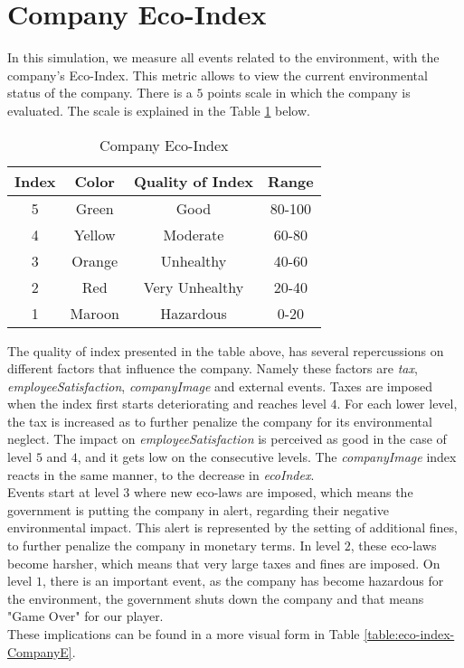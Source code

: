 \section{Company Eco-Index}
\label{sec:compEco-idex}
In this simulation, we measure all events related to the environment, with the company's Eco-Index. This metric allows to view the current environmental status of the company. There is a $5$ points scale in which the company is evaluated. The scale is explained in the Table \ref{table:eco-index-Company} below. \\

\begin{table}[ht]
\centering
\begin{tabular}{|c|c|c|c|}
\hline
 Index & Color & Quality of Index & Range \\
\hline
 5 & \cellcolor[HTML]{228b22}Green & Good & 80-100\\ \hline
 4 & \cellcolor[HTML]{ffff00}Yellow & Moderate & 60-80\\  \hline
 3 & \cellcolor[HTML]{ffd700}Orange & Unhealthy & 40-60\\ \hline
 2 & \cellcolor[HTML]{ff0000}Red & Very Unhealthy & 20-40 \\ \hline
 1 & \cellcolor[HTML]{a52a2a}Maroon & Hazardous & 0-20\\
\hline
\end{tabular}
\caption{Company Eco-Index}
\label{table:eco-index-Company}
\end{table}

The quality of index presented in the table above, has several repercussions on different factors that influence the company. Namely these factors are \textit{tax}, \textit{employeeSatisfaction}, \textit{companyImage} and external events. Taxes are imposed when the index first starts deteriorating and reaches level $4$. For each lower level, the tax is increased as to further penalize the company for its environmental neglect. The impact on \textit{employeeSatisfaction} is perceived as good in the case of level $5$ and $4$, and it gets low on the consecutive levels. The \textit{companyImage} index reacts in the same manner, to the decrease in \textit{ecoIndex}.\\ 
Events start at level $3$ where new eco-laws are imposed, which means the government is putting the company in alert, regarding their negative environmental impact. This alert is represented by the setting of additional fines, to further penalize the company in monetary terms. In level $2$, these eco-laws become harsher, which means that very large taxes and fines are imposed. On level $1$, there is an important event, as the company has become hazardous for the environment, the government shuts down the company and that means "Game Over" for our player. \\
 These implications can be found in a more visual form in Table \ref{table:eco-index-CompanyE}.

